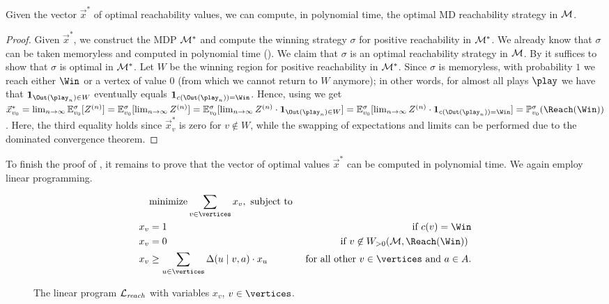 \begin{lemma}
\label{5-lem:quant-reach-strat-contsruction}
Given the vector $\vec{x}^*$ of optimal reachability values, we can compute, in polynomial time, the optimal MD reachability strategy in $\mathcal{M}$.
\end{lemma}
\begin{proof}
Given $\vec{x}^*$, we construct the MDP $\mathcal{M}^*$ and compute the winning strategy $\sigma$ for positive reachability in $\mathcal{M}^*$. We already know that $\sigma$ can be taken memoryless and computed in polynomial time (). We claim that $\sigma$ is an optimal reachability strategy in $\mathcal{M}$. By  it suffices to show that $\sigma$ is optimal in $\mathcal{M}^*$. Let $W$ be the winning region for positive reachability in $\mathcal{M}^*$. Since $\sigma$ is memoryless, with probability $1$ we reach either $\Win$ or a vertex of value $0$ (from which we cannot return to $W$ anymore); in other words, for almost all plays $\play$ we have that $\indicator{\Out(\play_n)\in W}$ eventually equals $\indicator{\colouring(\Out(\play_n)) = \Win}$. Hence, using  we get $\vec{x}^*_{\vinit} = \lim_{n\rightarrow\infty}\expv^\sigma_{\vinit}[Z^{(n)}] = \expv^\sigma_{\vinit}[\lim_{n\rightarrow\infty} Z^{(n)}] = \expv^\sigma_{\vinit}[\lim_{n\rightarrow\infty} Z^{(n)}\cdot\indicator{\Out(\play_n)\in W}] = \expv^\sigma_{\vinit}[\lim_{n\rightarrow\infty} Z^{(n)}\cdot \indicator{\colouring(\Out(\play_{n})) = \Win } ] = \probm_{\vinit}^\sigma(\Reach(\Win))$. Here, the third equality holds since $ \vec{x}^*_v $ is zero for $ v\not\in W $, while the  swapping of expectations and limits can be performed due to the dominated convergence theorem.
\end{proof}

To finish the proof of , it remains to prove that the vector of optimal values $\vec{x}^*$ can be computed in polynomial time. We again employ linear programming. 

\begin{figure}[h]
	\begin{align*}
	&\text{minimize} \sum_{v\in \vertices} x_v, \text{ subject to }&\\
	x_v &=1 &\text{if $\colouring({v}) = \Win$}\\
	x_v &=0 &\text{if $v \not \in \winPos(\mdp,\Reach(\Win))$  } \\
	x_v &\geq \sum_{u\in \vertices} \probTranFunc(u\mid v,a)\cdot x_u	&\text{for all other $v\in \vertices$ and $a\in \actions$.}%
	\end{align*}
	\caption{The linear program $\mathcal{L}_{\mathit{reach}}$ with variables $x_v$, $v\in \vertices$.}
	\label{5-fig:reach-lp}
\end{figure}

